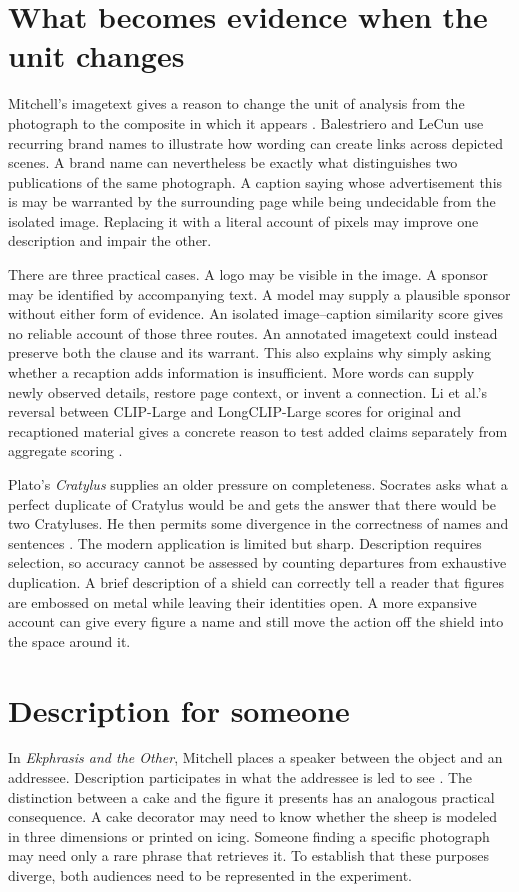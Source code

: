 \documentclass[11pt]{article}
\begin{document}
\section{What becomes evidence when the unit changes}
Mitchell's imagetext gives a reason to change the unit of analysis from the photograph to the composite in which it appears \cite{mitchell1994beyond}. Balestriero and LeCun use recurring brand names to illustrate how wording can create links across depicted scenes. A brand name can nevertheless be exactly what distinguishes two publications of the same photograph. A caption saying whose advertisement this is may be warranted by the surrounding page while being undecidable from the isolated image. Replacing it with a literal account of pixels may improve one description and impair the other.

There are three practical cases. A logo may be visible in the image. A sponsor may be identified by accompanying text. A model may supply a plausible sponsor without either form of evidence. An isolated image–caption similarity score gives no reliable account of those three routes. An annotated imagetext could instead preserve both the clause and its warrant. This also explains why simply asking whether a recaption adds information is insufficient. More words can supply newly observed details, restore page context, or invent a connection. Li et al.'s reversal between CLIP-Large and LongCLIP-Large scores for original and recaptioned material gives a concrete reason to test added claims separately from aggregate scoring \cite{li2024recaption}.

Plato's \emph{Cratylus} supplies an older pressure on completeness. Socrates asks what a perfect duplicate of Cratylus would be and gets the answer that there would be two Cratyluses. He then permits some divergence in the correctness of names and sentences \cite{platoCratylusHoran}. The modern application is limited but sharp. Description requires selection, so accuracy cannot be assessed by counting departures from exhaustive duplication. A brief description of a shield can correctly tell a reader that figures are embossed on metal while leaving their identities open. A more expansive account can give every figure a name and still move the action off the shield into the space around it.

\section{Description for someone}
In \emph{Ekphrasis and the Other}, Mitchell places a speaker between the object and an addressee. Description participates in what the addressee is led to see \cite{mitchell1994ekphrasis}. The distinction between a cake and the figure it presents has an analogous practical consequence. A cake decorator may need to know whether the sheep is modeled in three dimensions or printed on icing. Someone finding a specific photograph may need only a rare phrase that retrieves it. To establish that these purposes diverge, both audiences need to be represented in the experiment.
\end{document}
